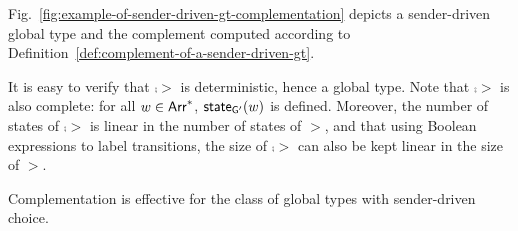 \begin{example}\label{ex:example-of-sender-driven-gt-complementation}
    Fig.~\ref{fig:example-of-sender-driven-gt-complementation} depicts a sender-driven global type
    and the complement computed according to Definition~\ref{def:complement-of-a-sender-driven-gt}.
\end{example}

It is easy to verify that $\comp{\gt}$ is deterministic, hence a global type. Note that $\comp{\gt}$
is also complete: for all $w\in\mathsf{Arr}^*$, $\mathsf{state}_{\mathsf{G}'}(w)$ is defined. Moreover, 
the number of states of $\comp{\gt}$ is linear in the number of states of $\gt$, and that using Boolean
expressions to label transitions, the size of $\comp{\gt}$ can also be kept linear in the size of $\gt$.

\begin{theorem}\label{thm:sender-driven-choice-complementation}
    Complementation is effective for the class of global types with sender-driven choice.
\end{theorem}
